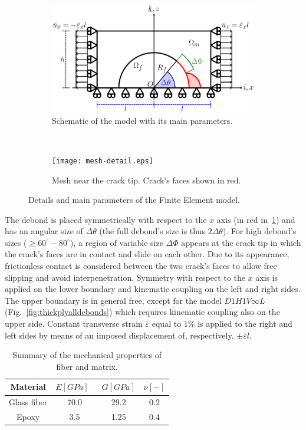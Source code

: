 \documentclass[review]{elsarticle}
\begin{document}
\begin{figure}[!h]
\centering
    \begin{subfigure}[b]{0.55\textwidth}
        \includegraphics[width=\textwidth]{RUC.pdf}
        \caption{Schematic of the model with its main parameters.}\label{subfig:modelschem}
    \end{subfigure} ~
    \begin{subfigure}[b]{0.4\textwidth}
        \texttt{[image: mesh-detail.eps]}
        \caption{Mesh near the crack tip. Crack's faces shown in red.}\label{subfig:meshdetail}
    \end{subfigure}

\caption{Details and main parameters of the Finite Element model.}\label{fig:FEmodel}
\end{figure}

The debond is placed symmetrically with respect to the $x$ axis (in red in~\ref{subfig:modelschem}) and has an angular size of $\Delta\theta$ (the full debond's size is thus $2\Delta\theta$). For high debond's sizes ($\geq 60^{\circ}-80^{\circ}$), a region of variable size $\Delta\Phi$ appears at the crack tip in which the crack's faces are in contact and slide on each other. Due to its appearance, frictionless contact is considered between the two crack's faces to allow free slipping and avoid interpenetration. Symmetry with respect to the $x$ axis is applied on the lower boundary and kinematic coupling on the left and right sides. The upper boundary is in general free, except for the model $D1H1V\infty L$ (Fig.~\ref{fig:thickplyalldebonds}) which requires kinematic coupling also on the upper side. Constant transverse strain $\bar{\varepsilon}$ equal to $1\%$ is applied to the right and left sides by means of an imposed displacement of, respectively, $\pm\bar{\varepsilon}l$.

\begin{table}[!htbp]
 \centering
 \caption{Summary of the mechanical properties of fiber and matrix.}
 \begin{tabular}{cccc}
\textbf{Material} & \textbf{$E\left[GPa\right]$}\ & \textbf{$G\left[GPa\right]$} & \textbf{$\nu\left[-\right]$} \\
\midrule
Glass fiber    & 70.0  & 29.2   & 0.2  \\
Epoxy    & 3.5    & 1.25   & 0.4  
\end{tabular}
\label{tab:phaseprop}
\end{table}
\end{document}
